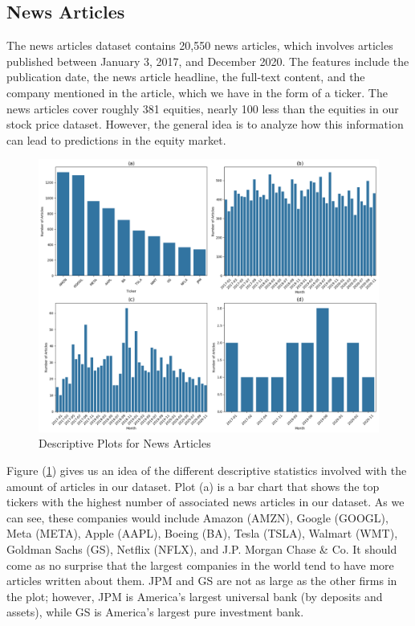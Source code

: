 \documentclass[12pt]{article}
\begin{document}
\subsection*{News Articles}

The news articles dataset contains 20,550 news articles, which involves articles published between January 3, 2017, and December 2020. The features include the publication date, the news article headline, the full-text content, and the company mentioned in the article, which we have in the form of a ticker. The news articles cover roughly 381 equities, nearly 100 less than the equities in our stock price dataset. However, the general idea is to analyze how this information can lead to predictions in the equity market.

\begin{figure}[h]
	\centering
	\includegraphics[width=0.9\linewidth]{plots/descriptive.png}
	\caption{Descriptive Plots for News Articles}
	\label{fig:descriptive}
\end{figure}

Figure (\ref{fig:descriptive}) gives us an idea of the different descriptive statistics involved with the amount of articles in our dataset. Plot (a) is a bar chart that shows the top tickers with the highest number of associated news articles in our dataset. As we can see, these companies would include Amazon (AMZN), Google (GOOGL), Meta (META), Apple (AAPL), Boeing (BA), Tesla (TSLA), Walmart (WMT), Goldman Sachs (GS), Netflix (NFLX), and J.P. Morgan Chase \& Co. It should come as no surprise that the largest companies in the world tend to have more articles written about them. JPM and GS are not as large as the other firms in the plot; however, JPM is America's largest universal bank (by deposits and assets), while GS is America's largest pure investment bank.
\end{document}
